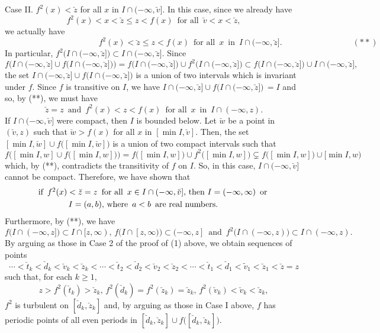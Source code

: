 \documentclass[12pt]{article}
\begin{document}
Case II.  $f^2(x) < \breve z$ for all $x$ in $I \cap (-\infty, \breve v]$.  In this case, since we already have $$f^2(x) < x < \breve z \le z < f(x) \,\,\, \text{for all} \,\,\, \breve v < x < \breve z,$$we actually have $$\qquad\qquad\qquad\qquad\qquad\quad\,\, f^2(x) < \breve z \le z < f(x) \,\,\, \text{for all} \,\,\, x \,\,\, \text{in} \,\,\, I \cap (-\infty, \breve z]. \qquad\qquad\qquad\qquad\,\,\, (**)$$
\noindent
In particular, $f^2\big(I \cap (-\infty, \breve z]\big) \subset I \cap (-\infty, \breve z]$.  Since 
$$
f\Big(I \cap (-\infty, \breve z] \cup f\big(I \cap (-\infty, \breve z]\big)\Bigr) = f\big(I \cap (-\infty, \breve z]\big) \cup f^2\big(I \cap (-\infty, \breve z]\big) \subset f\big(I \cap (-\infty, \breve z]\big) \cup I \cap (-\infty, \breve z],
$$ 
the set $I \cap (-\infty, \breve z] \cup f\big(I \cap (-\infty, \breve z]\big)$ is a union of two intervals which is invariant under $f$.  Since $f$ is transitive on $I$, we have $I \cap (-\infty, \breve z] \cup f\big(I \cap (-\infty, \breve z]\big) \,= I$ and so, by (**), we must have $$
\breve z = z \,\,\, \text{and} \,\,\, f^2(x) < z < f(x) \,\,\, \text{for all} \,\,\, x \,\,\, \text{in} \,\,\, I \cap (-\infty, z).
$$
\noindent
\indent If $I \cap (-\infty, \breve v]$ were compact, then $I$ is bounded below.  Let $\breve w$ be a point in $(\breve v, z)$ such that $\breve w > f(x)$ for all $x$ in $[\min I, \breve v]$.  Then, the set $[\min I, \breve w] \cup f\big([\min I, \breve w]\big)$ is a union of two compact intervals such that 
$$
f\Big([\min I, w] \cup f\big([\min I, w]\big)\Big) = f\big([\min I, w]\big) \cup f^2\big([\min I, w]\big) \subsetneq f\big([\min I, w]\big) \cup [\min I, w)
$$
which, by (**), contradicts the transitivity of $f$ on $I$.  So, in this case, $I \cap (-\infty, \breve v]$ cannot be compact.  Therefore, we have shown that 
\begin{multline*}
$$
\text{if} \,\,\, f^2(x) < \breve z = z \,\,\, \text{for all} \,\,\, x \in I \cap (-\infty, \breve v], \, \text{then} \,\, I = (-\infty, \infty) \,\,\, \text{or}\, \\ \, I = (a, b), \, \text{where} \,\,\, a < b \,\,\, \text{are real numbers.\qquad\,\,\,\,}
$$
\end{multline*}
Furthermore, by (**), we have 
$$
f\big(I \cap (-\infty, z]\big) \subset I \cap [z, \infty), \, f\big(I \cap [z, \infty)\big) \subset (-\infty, z] \,\,\, \text{and} \,\,\, f^2\big(I \cap (-\infty, z)\big) \subset I \cap (-\infty, z).
$$  
By arguing as those in Case 2 of the proof of (1) above, we obtain sequences of points 
$$
\cdots < \breve t_k < \breve d_k < \breve v_k < \breve z_k < \cdots < \breve t_2 < \breve d_2 < \breve v_2 < \breve z_2 < \cdots < \breve t_1 < \breve d_1 < \tilde v_1 < \breve z_1 < \breve z = z
$$
such that, for each $k \ge 1$, 
$$
z > f^2(\breve t_k) > \breve z_k, \, f^2(\breve d_k) = f^2(\breve z_k) = \breve z_k, \, f^2(\breve v_k) < \breve v_k < \breve z_k,
$$ 
$f^2$ is turbulent on $[\breve d_k, \breve z_k]$ and, by arguing as those in Case I above, $f$ has periodic points of all even periods in $[\breve d_k, \breve z_k] \cup f\bigl([\breve d_k, \breve z_k]\bigr)$.  
\end{document}
